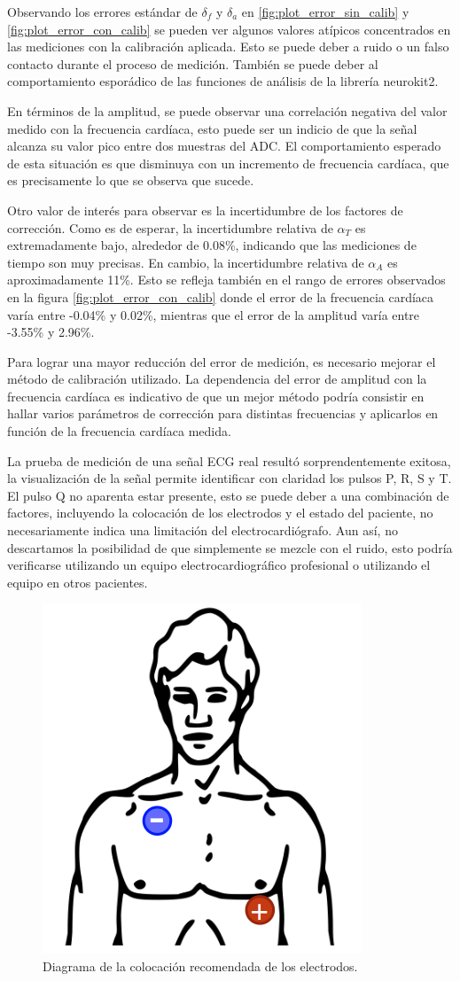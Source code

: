 \documentclass[conference]{IEEEtran}
\begin{document}
Observando los errores estándar de $\delta_f$ y $\delta_a$ en
\ref{fig:plot_error_sin_calib} y \ref{fig:plot_error_con_calib} se pueden
ver algunos valores atípicos concentrados en las mediciones con la calibración
aplicada. Esto se puede deber a ruido o un falso contacto durante el
proceso de medición. También se puede deber al comportamiento esporádico de
las funciones de análisis de la librería neurokit2.

En términos de la amplitud, se puede observar una correlación negativa del valor
medido con la frecuencia cardíaca, esto puede ser un indicio de que la señal
alcanza su valor pico entre dos muestras del ADC. El comportamiento esperado de
esta situación es que disminuya con un incremento de frecuencia cardíaca,
que es precisamente lo que se observa que sucede.

Otro valor de interés para observar es la incertidumbre de los factores de
corrección. Como es de esperar, la incertidumbre relativa de $\alpha_T$ es
extremadamente bajo, alrededor de 0.08\%, indicando que las mediciones de tiempo
son muy precisas. En cambio, la incertidumbre relativa de $\alpha_A$ es
aproximadamente 11\%. Esto se refleja también en el rango de errores observados
en la figura \ref{fig:plot_error_con_calib} donde el error de la frecuencia cardíaca varía entre
-0.04\% y 0.02\%, mientras que el error de la amplitud varía entre -3.55\%
y 2.96\%.

Para lograr una mayor reducción del error de medición, es necesario mejorar
el método de calibración utilizado. La dependencia del error de amplitud
con la frecuencia cardíaca es indicativo de que un mejor método podría
consistir en hallar varios parámetros de corrección para distintas frecuencias
y aplicarlos  en función de la frecuencia cardíaca medida.


La prueba de medición de una señal ECG real resultó sorprendentemente exitosa,
la visualización de la señal permite identificar con claridad los pulsos P, R, S
y T. El pulso Q no aparenta estar presente, esto se puede deber a una
combinación de factores, incluyendo la colocación de los electrodos y el estado
del paciente, no necesariamente indica una limitación del electrocardiógrafo.
Aun así, no descartamos la posibilidad de que simplemente se mezcle con el
ruido, esto podría verificarse utilizando un equipo electrocardiográfico
profesional o utilizando el equipo en otros pacientes.

\begin{figure}[t]
    \centering
    \includegraphics[width=0.5\linewidth]{figs/ubiacion_electrodos.png}
    \caption{Diagrama de la colocación recomendada de los electrodos.}
    \label{fig:ubicacion_electrodos}
\end{figure}

\newpage




\end{document}
